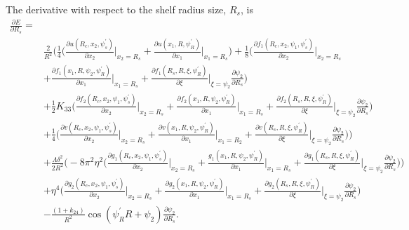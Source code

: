 \documentclass[12pt]{article}
\begin{document}
The derivative with respect to the shelf radius size, $R_s$, is
\begin{align}
\frac{\partial E}{\partial R_s}=&\nonumber\\
&\frac{2}{R^2}\bigg(\frac{1}{4}\bigg(\frac{\partial u(R_c,x_2,\psi_s^{\prime})}{\partial x_2}\bigg|_{x_2=R_s}+\frac{\partial u(x_1,R,\psi_R^{\prime})}{\partial x_1}\bigg|_{x_1=R_s}\bigg)+\frac{1}{8}\bigg(\frac{\partial f_1(R_c,x_2,\psi_1,\psi_s^{\prime})}{\partial x_2}\bigg|_{x_2=R_s}\nonumber\\
&+\frac{\partial f_1(x_1,R,\psi_2,\psi_R^{\prime})}{\partial x_1}\bigg|_{x_1=R_s}+\frac{\partial f_1(R_s,R,\xi,\psi_R^{\prime})}{\partial\xi}\bigg|_{\xi=\psi_2}\frac{\partial\psi_2}{\partial R_s}\bigg)\nonumber\\
&+\frac{1}{2}K_{33}\bigg(\frac{\partial f_2(R_c,x_2,\psi_1,\psi_s^{\prime})}{\partial x_2}\bigg|_{x_2=R_s}+\frac{\partial f_2(x_1,R,\psi_2,\psi_R^{\prime})}{\partial x_1}\bigg|_{x_1=R_s}+\frac{\partial f_2(R_s,R,\xi,\psi_R^{\prime})}{\partial\xi}\bigg|_{\xi=\psi_2}\frac{\partial\psi_2}{\partial R_s}\bigg)\nonumber\\
&+\frac{1}{4}\bigg(\frac{\partial v(R_c,x_2,\psi_1,\psi_s^{\prime})}{\partial x_2}\bigg|_{x_2=R_s}+\frac{\partial v(x_1,R,\psi_2,\psi_R^{\prime})}{\partial x_1}\bigg|_{x_1=R_2}+\frac{\partial v(R_s,R,\xi,\psi_R^{\prime})}{\partial\xi}\bigg|_{\xi=\psi_2}\frac{\partial\psi_2}{\partial R_s}\bigg)\bigg)\nonumber\\
&+\frac{\Lambda\delta^2}{2R^2}\bigg(-8\pi^2\eta^2\bigg(\frac{\partial g_1(R_c,x_2,\psi_1,\psi_s^{\prime})}{\partial x_2}\bigg|_{x_2=R_s}+\frac{g_1(x_1,R,\psi_2,\psi_R^{\prime})}{\partial x_1}\bigg|_{x_1=R_s}+\frac{\partial g_1(R_s,R,\xi,\psi_R^{\prime})}{\partial \xi}\bigg|_{\xi=\psi_2}\frac{\partial\psi_2}{\partial R_s}\bigg)\bigg)\nonumber\\
&+\eta^4\bigg(\frac{\partial g_2(R_c,x_2,\psi_1,\psi_s^{\prime})}{\partial x_2}\bigg|_{x_2=R_s}+\frac{\partial g_2(x_1,R,\psi_2,\psi_R^{\prime})}{\partial x_1}\bigg|_{x_1=R_s}+\frac{\partial g_2(R_s,R,\xi,\psi_R^{\prime})}{\partial\xi}\bigg|_{\xi=\psi_2}\frac{\partial \psi_2}{\partial R_s}\bigg)\nonumber\\
&-\frac{(1+k_{24})}{R^2}\cos(\psi_R^{\prime}R+\psi_2)\frac{\partial\psi_2}{\partial R_s}.\label{eq:dEdRs}
\end{align}
\end{document}
